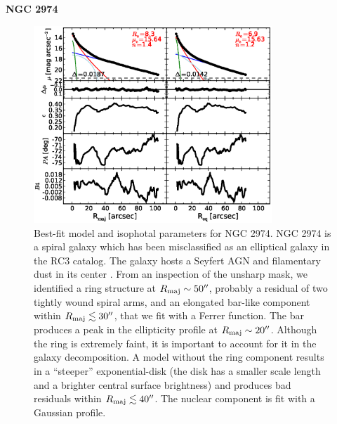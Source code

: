 \documentclass[preprint2]{emulateapj}
\newcommand{\fitfigurewidth}{0.8\textwidth}
\begin{document}
  \clearpage\newpage\noindent
  {\bf NGC 2974 \\}

  \begin{figure}[h]
  \begin{center}
  \includegraphics[width=\fitfigurewidth]{images/n2974_1Dfit.eps}
  \caption{Best-fit model and isophotal parameters for NGC 2974.
  NGC 2974 is a spiral galaxy which has been misclassified as an elliptical galaxy in the RC3 catalog.
  The galaxy hosts a Seyfert AGN \citep{veroncettyveron2006} and filamentary dust in its center \citep{tran2001}.
  From an inspection of the unsharp mask, we identified a ring structure at $R_{\rm maj} \sim 50''$, 
  probably a residual of two tightly wound spiral arms,
  and an elongated bar-like component within $R_{\rm maj} \lesssim 30''$, that we fit with a Ferrer function.
  The bar produces a peak in the ellipticity profile at $R_{\rm maj} \sim 20''$.
  Although the ring is extremely faint, it is important to account for it in the galaxy decomposition. 
  A model without the ring component results in a ``steeper'' exponential-disk (the disk has a smaller scale length 
  and a brighter central surface brightness) and produces bad residuals within $R_{\rm maj} \lesssim 40''$.
  The nuclear component is fit with a Gaussian profile.
  }
  \end{center}
  \end{figure}
\end{document}
